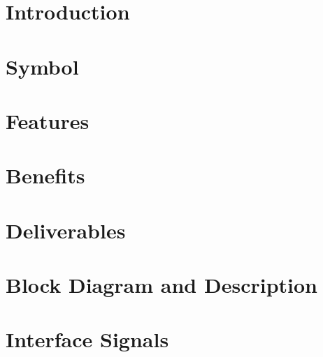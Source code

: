 \documentclass{../../submodules/TEX/document/ug/ug}
\begin{document}
\maketitle
\cleardoublepage
\tableofcontents
\listoftables
\listoffigures
\cleardoublepage

\section{Introduction}


\section{Symbol}


\section{Features}


\section{Benefits}


\section{Deliverables}


\section{Block Diagram and Description}


\section{Interface Signals}


\ifnum{}

\fi


\ifnum{}

\fi

\ifnum{}

\fi

\ifnum{}

\fi



\ifnum{}

\fi
\end{document}
